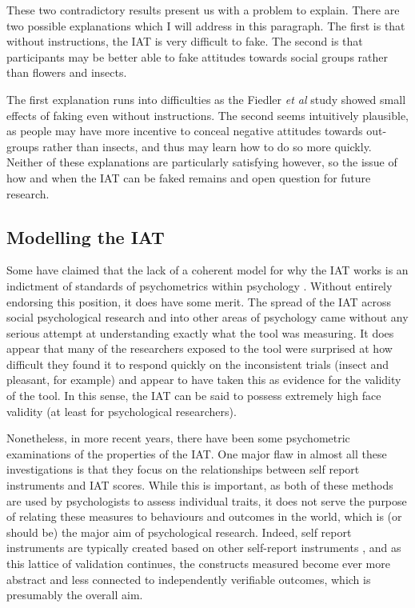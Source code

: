 These two contradictory results present us with a problem to explain. There are two possible explanations which I will address in this paragraph. The first is that without instructions, the IAT is very difficult to fake. The second is that participants may be better able to fake attitudes towards social groups rather than flowers and insects. 

The first explanation runs into difficulties as the Fiedler \textit{et al}  study showed small effects of faking even without instructions. The second seems intuitively plausible, as people may have more incentive to conceal negative attitudes towards out-groups rather than insects, and thus may learn how to do so more quickly. Neither of these explanations are particularly satisfying however, so the issue of how and when the IAT can be faked remains and open question for future research. 

 \subsection{Modelling the IAT}
 \label{sec:modelling-iat}

 Some have claimed that the lack of a coherent model for why the IAT works is an indictment of standards of psychometrics within psychology \cite{borsboom2006attack}. Without entirely endorsing this position, it does have some merit. The spread of the IAT across social psychological research and into other areas of psychology came without any serious attempt at understanding exactly what the tool was measuring. It does appear that many of the researchers exposed to the tool were surprised at how difficult they found it to respond quickly on the inconsistent trials (insect and pleasant, for example) and appear to have taken this as evidence for the validity of the tool. In this sense, the IAT can be said to possess extremely high face validity (at least for psychological researchers). 

Nonetheless, in more recent years, there have been some psychometric examinations of the properties of the IAT. One major flaw in almost all these investigations is that they focus on the relationships between self report instruments and IAT scores. While this is important, as both of these methods are used by psychologists to assess individual traits, it does not serve the purpose of relating these measures to behaviours and outcomes in the world, which is (or should be) the major aim of psychological research. Indeed, self report instruments are typically created based on other self-report instruments \cite{borsboom2006attack}, and as this lattice of validation continues, the constructs measured become ever more abstract and less connected to independently verifiable outcomes, which is presumably the overall aim. 

